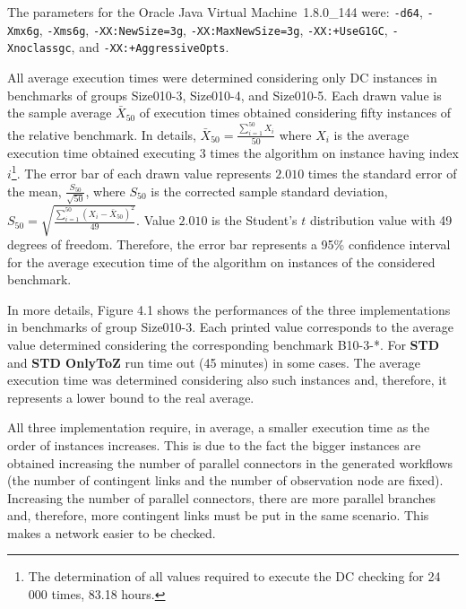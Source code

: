 \documentclass[a4paper,11pt]{article}
\begin{document}
The parameters for the Oracle Java Virtual Machine~1.8.0\_144 were: \texttt{-d64}, \texttt{-Xmx6g}, \texttt{-Xms6g}, \texttt{-XX:NewSize=3g}, \texttt{-XX:MaxNewSize=3g}, \texttt{-XX:+UseG1GC}, \texttt{-Xnoclassgc}, and \texttt{-XX:+AggressiveOpts}. 

All average execution times were determined considering only DC instances in benchmarks of groups Size010-3, Size010-4, and Size010-5.
Each drawn value is the sample average $\bar{X}_{50}$ of execution times obtained considering fifty instances of the relative benchmark. 
In details, $\bar{X}_{50}=\frac{\sum_{i=1}^{50} X_i}{50}$ where $X_i$ is the average execution time obtained executing 3 times the algorithm on instance having index $i$\footnote{The determination of all values required to execute the DC checking for 24 000 times, 83.18 hours.}.
The error bar of each drawn value represents $2.010$ times the standard error of the mean, $\frac{S_{50}}{\sqrt{50}}$, where $S_{50}$ is the corrected sample standard deviation, $S_{50}= \sqrt{\frac{\sum_{i=1}^{50} (X_i-\bar{X}_{50})^2}{49}}$. Value $2.010$ is the Student's $t$ distribution value with 49 degrees of freedom. 
Therefore, the error bar represents a 95\% confidence interval for the average execution time of the algorithm on instances of the considered benchmark.

In more details, Figure 4.1 shows the performances of the three implementations in benchmarks of group Size010-3. 
Each printed value corresponds to the average value determined considering the corresponding benchmark B10-3-*.
For \textbf{STD} and \textbf{STD OnlyToZ} run time out (45 minutes) in some cases. The average execution time was determined considering also such instances and, therefore, it represents a lower bound to the real average.

All three implementation require, in average, a smaller execution time as the order of instances increases. 
This is due to the fact the bigger instances are obtained increasing the number of parallel connectors in the generated workflows (the number of contingent links and the number of observation node are fixed). Increasing the number of parallel connectors, there are more parallel branches and, therefore, more contingent links must be put in the same scenario.
This makes a network easier to be checked. 
\end{document}
